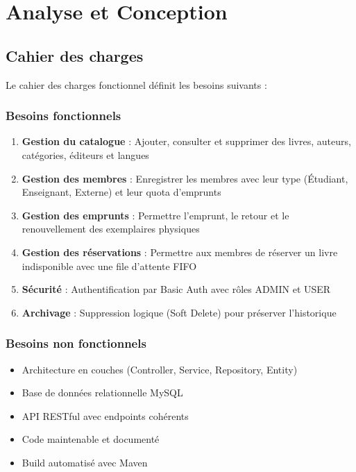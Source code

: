\documentclass[12pt,a4paper,twoside]{report}
\begin{document}
\chapter{Analyse et Conception}

\section{Cahier des charges}

Le cahier des charges fonctionnel définit les besoins suivants :

\subsection{Besoins fonctionnels}

\begin{enumerate}
    \item \textbf{Gestion du catalogue} : Ajouter, consulter et supprimer des livres, auteurs, catégories, éditeurs et langues
    \item \textbf{Gestion des membres} : Enregistrer les membres avec leur type (Étudiant, Enseignant, Externe) et leur quota d'emprunts
    \item \textbf{Gestion des emprunts} : Permettre l'emprunt, le retour et le renouvellement des exemplaires physiques
    \item \textbf{Gestion des réservations} : Permettre aux membres de réserver un livre indisponible avec une file d'attente FIFO
    \item \textbf{Sécurité} : Authentification par Basic Auth avec rôles ADMIN et USER
    \item \textbf{Archivage} : Suppression logique (Soft Delete) pour préserver l'historique
\end{enumerate}

\subsection{Besoins non fonctionnels}

\begin{itemize}
    \item Architecture en couches (Controller, Service, Repository, Entity)
    \item Base de données relationnelle MySQL
    \item API RESTful avec endpoints cohérents
    \item Code maintenable et documenté
    \item Build automatisé avec Maven
\end{itemize}
\end{document}

